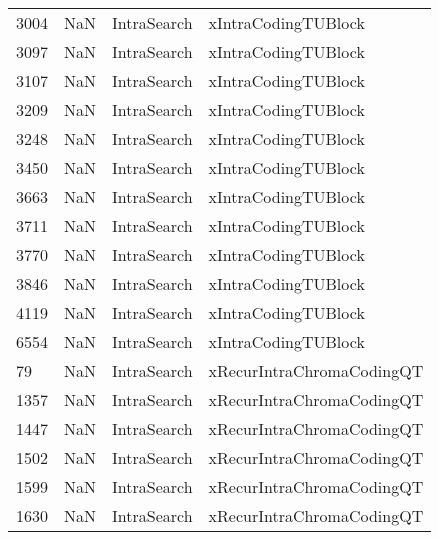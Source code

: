 \begin{tabular}{llll}
3004 &                   NaN &                IntraSearch &                       xIntraCodingTUBlock \\
3097 &                   NaN &                IntraSearch &                       xIntraCodingTUBlock \\
3107 &                   NaN &                IntraSearch &                       xIntraCodingTUBlock \\
3209 &                   NaN &                IntraSearch &                       xIntraCodingTUBlock \\
3248 &                   NaN &                IntraSearch &                       xIntraCodingTUBlock \\
3450 &                   NaN &                IntraSearch &                       xIntraCodingTUBlock \\
3663 &                   NaN &                IntraSearch &                       xIntraCodingTUBlock \\
3711 &                   NaN &                IntraSearch &                       xIntraCodingTUBlock \\
3770 &                   NaN &                IntraSearch &                       xIntraCodingTUBlock \\
3846 &                   NaN &                IntraSearch &                       xIntraCodingTUBlock \\
4119 &                   NaN &                IntraSearch &                       xIntraCodingTUBlock \\
6554 &                   NaN &                IntraSearch &                       xIntraCodingTUBlock \\
79   &                   NaN &                IntraSearch &                 xRecurIntraChromaCodingQT \\
1357 &                   NaN &                IntraSearch &                 xRecurIntraChromaCodingQT \\
1447 &                   NaN &                IntraSearch &                 xRecurIntraChromaCodingQT \\
1502 &                   NaN &                IntraSearch &                 xRecurIntraChromaCodingQT \\
1599 &                   NaN &                IntraSearch &                 xRecurIntraChromaCodingQT \\
1630 &                   NaN &                IntraSearch &                 xRecurIntraChromaCodingQT \\

\end{tabular}
